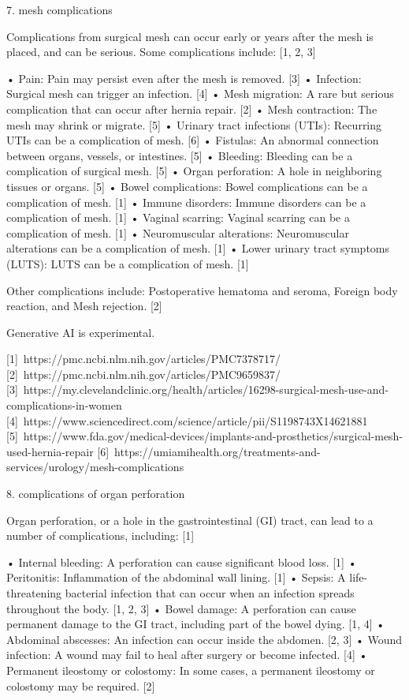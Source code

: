 7. mesh complications

Complications from surgical mesh can occur early or years after the mesh is placed, and can be serious. Some complications include: [1, 2, 3]  

• Pain: Pain may persist even after the mesh is removed. [3]  
• Infection: Surgical mesh can trigger an infection. [4]  
• Mesh migration: A rare but serious complication that can occur after hernia repair. [2]  
• Mesh contraction: The mesh may shrink or migrate. [5]  
• Urinary tract infections (UTIs): Recurring UTIs can be a complication of mesh. [6]  
• Fistulas: An abnormal connection between organs, vessels, or intestines. [5]  
• Bleeding: Bleeding can be a complication of surgical mesh. [5]  
• Organ perforation: A hole in neighboring tissues or organs. [5]  
• Bowel complications: Bowel complications can be a complication of mesh. [1]  
• Immune disorders: Immune disorders can be a complication of mesh. [1]  
• Vaginal scarring: Vaginal scarring can be a complication of mesh. [1]  
• Neuromuscular alterations: Neuromuscular alterations can be a complication of mesh. [1]  
• Lower urinary tract symptoms (LUTS): LUTS can be a complication of mesh. [1]  

Other complications include: Postoperative hematoma and seroma, Foreign body reaction, and Mesh rejection. [2]  

Generative AI is experimental.

[1] https://pmc.ncbi.nlm.nih.gov/articles/PMC7378717/
[2] https://pmc.ncbi.nlm.nih.gov/articles/PMC9659837/
[3] https://my.clevelandclinic.org/health/articles/16298-surgical-mesh-use-and-complications-in-women
[4] https://www.sciencedirect.com/science/article/pii/S1198743X14621881
[5] https://www.fda.gov/medical-devices/implants-and-prosthetics/surgical-mesh-used-hernia-repair
[6] https://umiamihealth.org/treatments-and-services/urology/mesh-complications

8. complications of organ perforation

Organ perforation, or a hole in the gastrointestinal (GI) tract, can lead to a number of complications, including: [1]  

• Internal bleeding: A perforation can cause significant blood loss. [1]  
• Peritonitis: Inflammation of the abdominal wall lining. [1]  
• Sepsis: A life-threatening bacterial infection that can occur when an infection spreads throughout the body. [1, 2, 3]  
• Bowel damage: A perforation can cause permanent damage to the GI tract, including part of the bowel dying. [1, 4]  
• Abdominal abscesses: An infection can occur inside the abdomen. [2, 3]  
• Wound infection: A wound may fail to heal after surgery or become infected. [4]  
• Permanent ileostomy or colostomy: In some cases, a permanent ileostomy or colostomy may be required. [2]  

